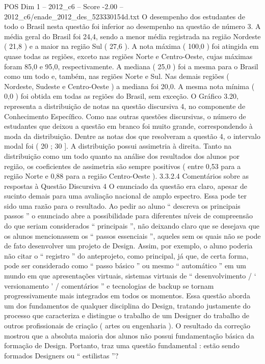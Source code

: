 \begin{textsample}{POS Dim 1 – 2012\_c6 – Score -2.00 – 2012\_c6/enade\_2012\_des\_523330154d.txt}
O desempenho dos estudantes de todo o Brasil nesta questão foi inferior ao desempenho na questão de número 3.
A média geral do Brasil foi 24,4, sendo a menor média registrada na região Nordeste ( 21,8 ) e a maior na região Sul ( 27,6 ).
A nota máxima ( 100,0 ) foi atingida em quase todas as regiões, exceto nas regiões Norte e Centro-Oeste, cujas máximas foram 85,0 e 95,0, respectivamente.
A mediana ( 25,0 ) foi a mesma para o Brasil como um todo e, também, nas regiões Norte e Sul.
Nas demais regiões ( Nordeste, Sudeste e Centro-Oeste ) a mediana foi 20,0.
A mesma nota mínima ( 0,0 ) foi obtida em todas as regiões do Brasil, sem exceção.
O Gráfico 3.20, representa a distribuição de notas na questão discursiva 4, no componente de Conhecimento Específico.
Como nas outras questões discursivas, o número de estudantes que deixou a questão em branco foi muito grande, correspondendo à moda da distribuição.
Dentre as notas dos que resolveram a questão 4, o intervalo modal foi ( 20 ; 30 ].
A distribuição possui assimetria à direita.
Tanto na distribuição como um todo quanto na análise dos resultados dos alunos por região, os coeficientes de assimetria são sempre positivos ( entre 0,53 para a região Norte e 0,88 para a região Centro-Oeste ). 3.3.2.4 Comentários sobre as respostas à Questão Discursiva 4 O enunciado da questão era claro, apesar de sucinto demais para uma avaliação nacional de amplo espectro.
Essa pode ter sido uma razão para o resultado.
Ao pedir ao aluno “ descreva os principais passos ” o enunciado abre a possibilidade para diferentes níveis de compreensão do que seriam considerados “ principais ”, não deixando claro que se desejava que os alunos mencionassem os “ passos essenciais ”, aqueles sem os quais não se pode de fato desenvolver um projeto de Design.
Assim, por exemplo, o aluno poderia não citar o “ registro ” do anteprojeto, como principal, já que, de certa forma, pode ser considerado como “ passo básico ” ou mesmo “ automático ” em um mundo em que apresentações virtuais, sistemas virtuais de “ desenvolvimento / ‘ versionamento ’ / comentários ” e tecnologias de backup se tornam progressivamente mais integrados em todos os momentos.
Essa questão aborda um dos fundamentos de qualquer disciplina do Design, tratando justamente do processo que caracteriza e distingue o trabalho de um Designer do trabalho de outros profissionais de criação ( artes ou engenharia ).
O resultado da correção mostrou que a absoluta maioria dos alunos não possui fundamentação básica da formação de Design.
Portanto, traz uma questão fundamental : estão sendo formados Designers ou “ estilistas ”?

\end{textsample}
